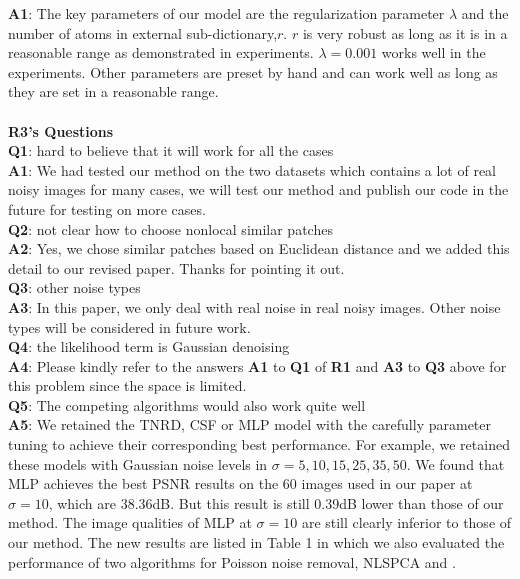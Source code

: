 \documentclass[10pt,twocolumn,letterpaper]{article}
\begin{document}
\textbf{A1}: The key parameters of our model are the regularization parameter $\lambda$ and the number of atoms in external sub-dictionary,$r$. $r$ is very robust as long as it is in a reasonable range as demonstrated in experiments. $\lambda=0.001$ works well in the experiments. Other parameters are preset by hand and can work well as long as they are set in a reasonable range.
\\
\\
\textbf{R3's Questions}
\\
\textbf{Q1}: hard to believe that it will work for all the cases
\\
\textbf{A1}: We had tested our method on the two datasets which contains a lot of real noisy images for many cases, we will test our method and publish our code in the future for testing on more cases.
\\
\textbf{Q2}: not clear how to choose nonlocal similar patches
\\
\textbf{A2}: Yes, we chose similar patches based on Euclidean distance and we added this detail to our revised paper. Thanks for pointing it out.
\\
\textbf{Q3}: other noise types
\\
\textbf{A3}: In this paper, we only deal with real noise in real noisy images. Other noise types will be considered in future work.
\\
\textbf{Q4}: the likelihood term is Gaussian denoising
\\
\textbf{A4}: Please kindly refer to the answers \textbf{A1} to \textbf{Q1} of \textbf{R1} and \textbf{A3} to \textbf{Q3} above for this problem since the space is limited. 
\\
\textbf{Q5}: The competing algorithms would also work quite well
\\
\textbf{A5}: We retained the TNRD, CSF or MLP model with the carefully parameter tuning to achieve their corresponding best performance. For example, we retained these models with Gaussian noise levels in $\sigma = 5, 10, 15, 25, 35, 50$. We found that MLP achieves the best PSNR results on the 60 images used in our paper at $\sigma = 10$, which are 38.36dB. But this result is still 0.39dB lower than those of our method. The image qualities of MLP at $\sigma = 10$ are still clearly inferior to those of our method. The new results are listed in Table 1 in which we also evaluated the performance of two algorithms for Poisson noise removal, NLSPCA \cite{nlpca} and \cite{makitalo2013optimal}. 
\end{document}
